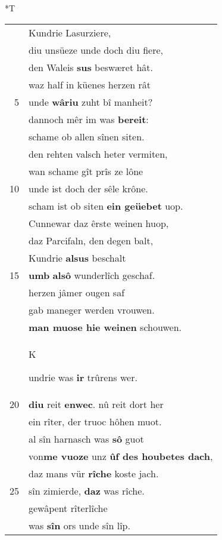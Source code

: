 \documentclass[8pt,a4paper,notitlepage]{article}
\begin{document}
\begin{table}[ht]
\begin{minipage}[t]{0.5\linewidth}
\end{minipage}
\hspace{0.5cm}
\begin{minipage}[t]{0.5\linewidth}
\small
\begin{center}*T
\end{center}
\begin{tabular}{rl}
 & Kundrie Lasurziere,\\ 
 & diu unsüeze unde doch diu fiere,\\ 
 & den Waleis \textbf{sus} beswæret hât.\\ 
 & waz half in küenes herzen rât\\ 
5 & unde \textbf{wâriu} zuht bî manheit?\\ 
 & dannoch mêr im was \textbf{bereit}:\\ 
 & schame ob allen sînen siten.\\ 
 & den rehten valsch heter vermiten,\\ 
 & wan schame gît prîs ze lône\\ 
10 & unde ist doch der sêle krône.\\ 
 & scham ist ob siten \textbf{ein geüebet} uop.\\ 
 & Cunnewar daz êrste weinen huop,\\ 
 & daz Parcifaln, den degen balt,\\ 
 & Kundrie \textbf{alsus} beschalt\\ 
15 & \textbf{umb} \textbf{alsô} wunderlîch geschaf.\\ 
 & herzen jâmer ougen saf\\ 
 & gab maneger werden vrouwen.\\ 
 & \textbf{man muose hie weinen} schouwen.\\ 
 & \begin{large}K\end{large}undrie was \textbf{ir} trûrens wer.\\ 
20 & \textbf{diu} reit \textbf{enwec}. nû reit dort her\\ 
 & ein rîter, der truoc hôhen muot.\\ 
 & al sîn harnasch was \textbf{sô} guot\\ 
 & von\textbf{me vuoze} unz \textbf{ûf des houbetes dach},\\ 
 & daz mans vür \textbf{rîche} koste jach.\\ 
25 & sîn zimierde, \textbf{daz} was rîche.\\ 
 & gewâpent rîterlîche\\ 
 & was \textbf{sîn} ors unde sîn lîp.\\ 

\end{tabular}
\end{minipage}
\end{table}
\end{document}
